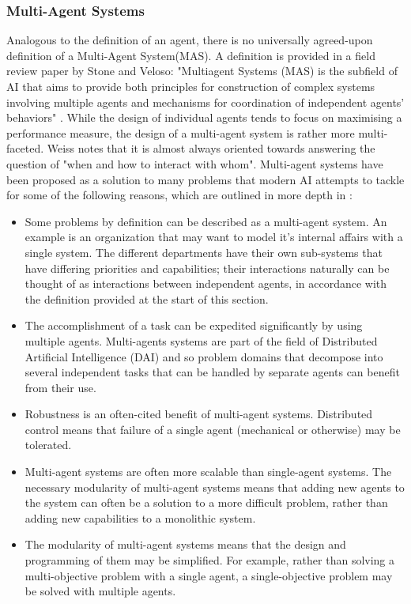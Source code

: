 \subsubsection{Multi-Agent Systems}
Analogous to the definition of an agent, there is no universally agreed-upon definition of a Multi-Agent System(MAS). A definition is provided in a field review paper by Stone and Veloso: "Multiagent Systems (MAS) is the subfield of AI that aims to provide both principles for construction of  complex  systems  involving  multiple  agents  and  mechanisms  for  coordination  of  independent  agents’ behaviors" \cite{Stone2000MultiagentPerspective}. While the design of individual agents tends to focus on maximising a performance measure, the design of a multi-agent system is rather more multi-faceted. Weiss notes that it is almost always oriented towards answering the question of "when and how to interact with whom"\cite{MAS:AModernApproachToDAI}. Multi-agent systems have been proposed as a solution to many problems that modern AI attempts to tackle for some of the following reasons, which are outlined in more depth in \cite{Stone2000MultiagentPerspective}: 
\begin{itemize}
    \item Some problems by definition can be described as a multi-agent system. An example is an organization that may want to model it's internal affairs with a single system. The different departments have their own sub-systems that have differing priorities and capabilities; their interactions naturally can be thought of as interactions between independent agents, in accordance with the definition provided at the start of this section.
    \item The accomplishment of a task can be expedited significantly by using multiple agents. Multi-agents systems are part of the field of Distributed Artificial Intelligence (DAI) and so problem domains that decompose into several independent tasks that can be handled by separate agents can benefit from their use.
    \item Robustness is an often-cited benefit of multi-agent systems. Distributed control means that failure of a single agent (mechanical or otherwise) may be tolerated.
    \item Multi-agent systems are often more scalable than single-agent systems. The necessary modularity of multi-agent systems means that adding new agents to the system can often be a solution to a more difficult problem, rather than adding new capabilities to a monolithic system. 
    \item The modularity of multi-agent systems means that the design and programming of them may be simplified. For example, rather than solving a multi-objective problem with a single agent, a single-objective problem may be solved with multiple agents.
    
    
\end{itemize}
